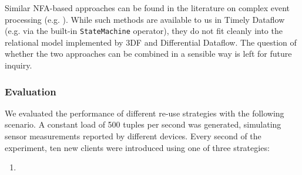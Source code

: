 \documentclass[../catalog.tex]{subfiles}
\begin{document}
Similar NFA-based approaches can be found in the literature on complex
event processing (e.g. \cite{agrawal2008}). While such methods are
available to us in Timely Dataflow (e.g. via the built-in
\texttt{StateMachine} operator), they do not fit cleanly into the
relational model implemented by 3DF and Differential Dataflow. The
question of whether the two approaches can be combined in a sensible
way is left for future inquiry.

\subsubsection{Evaluation}

We evaluated the performance of different re-use strategies with the
following scenario. A constant load of 500 tuples per second was
generated, simulating sensor measurements reported by different
devices. Every second of the experiment, ten new clients were
introduced using one of three strategies:

\begin{enumerate}
  \item 
\end{enumerate}
\end{document}
